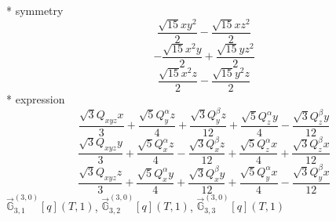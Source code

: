 \documentclass[fleqn,8pt]{jsarticle}
\begin{document}
\noindent\quad ** symmetry
\begin{dmath*}
\frac{\sqrt{15} x y^{2}}{2} - \frac{\sqrt{15} x z^{2}}{2}
\end{dmath*}
\begin{dmath*}
- \frac{\sqrt{15} x^{2} y}{2} + \frac{\sqrt{15} y z^{2}}{2}
\end{dmath*}
\begin{dmath*}
\frac{\sqrt{15} x^{2} z}{2} - \frac{\sqrt{15} y^{2} z}{2}
\end{dmath*}
\noindent\quad ** expression
\begin{dmath*}
\frac{\sqrt{3} Q_{xyz} x}{3} + \frac{\sqrt{5} Q_{y}^{\alpha} z}{4} + \frac{\sqrt{3} Q_{y}^{\beta} z}{12} + \frac{\sqrt{5} Q_{z}^{\alpha} y}{4} - \frac{\sqrt{3} Q_{z}^{\beta} y}{12}
\end{dmath*}
\begin{dmath*}
\frac{\sqrt{3} Q_{xyz} y}{3} + \frac{\sqrt{5} Q_{x}^{\alpha} z}{4} - \frac{\sqrt{3} Q_{x}^{\beta} z}{12} + \frac{\sqrt{5} Q_{z}^{\alpha} x}{4} + \frac{\sqrt{3} Q_{z}^{\beta} x}{12}
\end{dmath*}
\begin{dmath*}
\frac{\sqrt{3} Q_{xyz} z}{3} + \frac{\sqrt{5} Q_{x}^{\alpha} y}{4} + \frac{\sqrt{3} Q_{x}^{\beta} y}{12} + \frac{\sqrt{5} Q_{y}^{\alpha} x}{4} - \frac{\sqrt{3} Q_{y}^{\beta} x}{12}
\end{dmath*}
\noindent\quad $\vec{\mathbb{G}}_{3,1}^{(3,0)}[q](T,1)$, $\vec{\mathbb{G}}_{3,2}^{(3,0)}[q](T,1)$, $\vec{\mathbb{G}}_{3,3}^{(3,0)}[q](T,1)$
\end{document}
